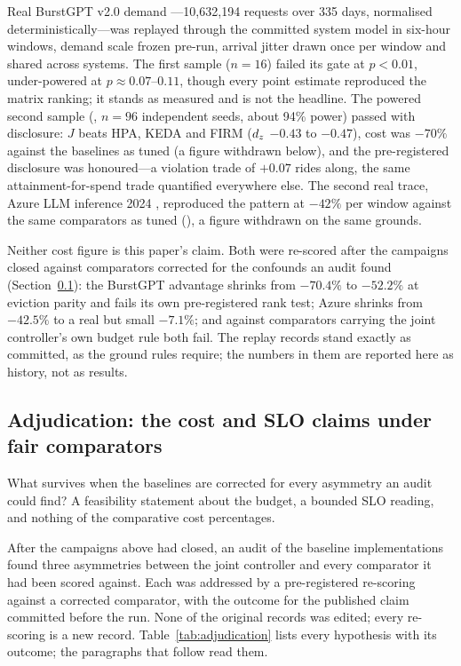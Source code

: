 Real BurstGPT v2.0 demand \citep{burstgpt2024}---10,632,194 requests over
335 days, normalised deterministically---was replayed through the
committed system model in six-hour windows, demand scale frozen pre-run,
arrival jitter drawn once per window and shared across systems. The first
sample ($n = 16$) failed its gate at $p < 0.01$, under-powered at $p
\approx 0.07$--$0.11$, though every point estimate reproduced the matrix
ranking; it stands as measured and is not the headline. The powered
second sample (, $n = 96$ independent seeds,
about 94\% power) passed with disclosure: $J$ beats HPA, KEDA and FIRM
($d_z$ $-0.43$ to $-0.47$), cost was $-70\%$ against the baselines as tuned
(a figure withdrawn below), and the pre-registered disclosure was
honoured---a violation trade of $+0.07$ rides along, the same
attainment-for-spend trade quantified everywhere else. The second real
trace, Azure LLM inference 2024 \citep{azurellmtrace2024}, reproduced the
pattern at $-42\%$ per window against the same comparators as tuned
(), a figure withdrawn on the same grounds.

Neither cost figure is this paper's claim. Both were re-scored after the
campaigns closed against comparators corrected for the confounds an audit
found (Section~\ref{sec:eval-adjudication}): the BurstGPT advantage
shrinks from $-70.4\%$ to $-52.2\%$ at eviction parity and fails its own
pre-registered rank test; Azure shrinks from $-42.5\%$ to a real but small
$-7.1\%$; and against comparators carrying the joint controller's own
budget rule both fail. The replay records stand exactly as committed, as
the ground rules require; the numbers in them are reported here as
history, not as results.

\subsection{Adjudication: the cost and SLO claims under fair comparators}
\label{sec:eval-adjudication}

What survives when the baselines are corrected for every asymmetry an
audit could find? A feasibility statement about the budget, a bounded SLO
reading, and nothing of the comparative cost percentages.

After the campaigns above had closed, an audit of the baseline
implementations found three asymmetries between the joint controller and
every comparator it had been scored against. Each was addressed by a
pre-registered re-scoring against a corrected comparator, with the outcome
for the published claim committed before the run. None of the original
records was edited; every re-scoring is a new record.
Table~\ref{tab:adjudication} lists every hypothesis with its outcome; the
paragraphs that follow read them.

